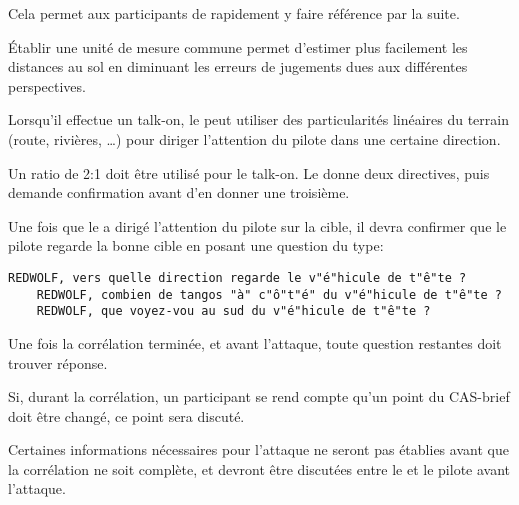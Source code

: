 \begin{e1}
\begin{e2}
\begin{e4}
			Cela permet aux participants de rapidement y faire référence par la suite.
			
			\item Établir une unité de mesure commune permet d'estimer plus facilement les distances au sol en diminuant les erreurs de jugements dues aux différentes perspectives.
			
			\item Lorsqu'il effectue un talk-on, le \ja{} peut utiliser des particularités linéaires du terrain (route, rivières, \ldots) pour diriger l'attention du pilote dans une certaine direction.
			
			\item Un ratio de 2:1 doit être utilisé pour le talk-on. Le \ja{} donne deux directives, puis demande confirmation avant d'en donner une troisième.
			
			\begin{minipage}{\linewidth}
				
				\item Une fois que le \ja{} a dirigé l'attention du pilote sur la cible, il devra confirmer que le pilote regarde la bonne cible en posant une question du type:
				\begin{lstlisting}[caption=Corrélation: confirmation de la cible, label=9ltalkonconfirmtgt]
	REDWOLF, vers quelle direction regarde le v"é"hicule de t"ê"te ?
	REDWOLF, combien de tangos "à" c"ô"t"é" du v"é"hicule de t"ê"te ?
	REDWOLF, que voyez-vou au sud du v"é"hicule de t"ê"te ?
				\end{lstlisting}
			\end{minipage}
			
		\end{e4}
		
	\end{e2}
		
	
	\begin{e2}
		
		\item Une fois la corrélation terminée, et avant l'attaque, toute question restantes doit trouver réponse.
		
		Si, durant la corrélation, un participant se rend compte qu'un point du CAS-brief doit être changé, ce point sera discuté.
		
		Certaines informations nécessaires pour l'attaque ne seront pas établies avant que la corrélation ne soit complète, et devront être discutées entre le \ja{} et le pilote avant l'attaque.
		

\end{e2}
\end{e1}
